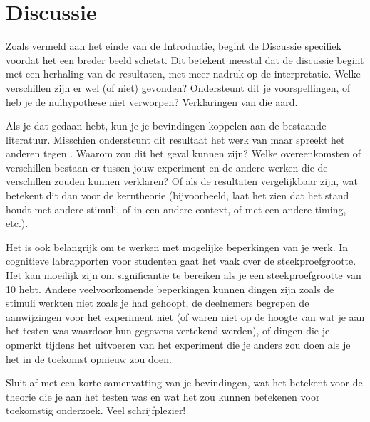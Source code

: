 \documentclass[stu,12pt,floatsintext]{apa7}
\begin{document}
\section{Discussie}

Zoals vermeld aan het einde van de Introductie, begint de Discussie specifiek voordat het een breder beeld schetst. Dit betekent meestal dat de discussie begint met een herhaling van de resultaten, met meer nadruk op de interpretatie. Welke verschillen zijn er wel (of niet) gevonden? Ondersteunt dit je voorspellingen, of heb je de nulhypothese niet verworpen? Verklaringen van die aard.


Als je dat gedaan hebt, kun je je bevindingen koppelen aan de bestaande literatuur. Misschien ondersteunt dit resultaat het werk van \textcite{Contributor2023} maar spreekt het anderen tegen \parencite[bv.,][]{Sample2024}.  %
Waarom zou dit het geval kunnen zijn? Welke overeenkomsten of verschillen bestaan er tussen jouw experiment en de andere werken die de verschillen zouden kunnen verklaren? Of als de resultaten vergelijkbaar zijn, wat betekent dit dan voor de kerntheorie (bijvoorbeeld, laat het zien dat het stand houdt met andere stimuli, of in een andere context, of met een andere timing, etc.).

Het is ook belangrijk om te werken met mogelijke beperkingen van je werk. In cognitieve labrapporten voor studenten gaat het vaak over de steekproefgrootte. Het kan moeilijk zijn om significantie te bereiken als je een steekproefgrootte van 10 hebt. Andere veelvoorkomende beperkingen kunnen dingen zijn zoals de stimuli werkten niet zoals je had gehoopt, de deelnemers begrepen de aanwijzingen voor het experiment niet (of waren niet op de hoogte van wat je aan het testen was waardoor hun gegevens vertekend werden), of dingen die je opmerkt tijdens het uitvoeren van het experiment die je anders zou doen als je het in de toekomst opnieuw zou doen.

Sluit af met een korte samenvatting van je bevindingen, wat het betekent voor de theorie die je aan het testen was en wat het zou kunnen betekenen voor toekomstig onderzoek. 
Veel schrijfplezier!


\printbibliography
\end{document}
